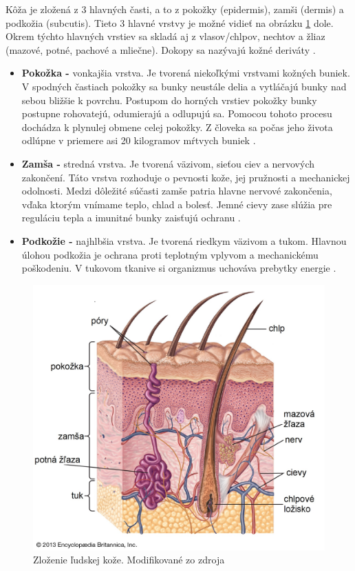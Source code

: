 Kôža je zložená z 3 hlavných časti, a to z pokožky (epidermis), zamši (dermis) a podkožia (subcutis). Tieto 3 hlavné vrstvy je možné vidieť na obrázku \ref{fig:koza} dole. Okrem týchto hlavných vrstiev sa skladá aj z vlasov/chlpov, nechtov a žliaz (mazové, potné, pachové a mliečne). Dokopy sa nazývajú kožné deriváty \cite{Pokorna2012}. 
\begin{itemize}  
\item \textbf{Pokožka -} vonkajšia vrstva. Je tvorená niekoľkými vrstvami kožných buniek. V spodných častiach pokožky sa bunky neustále delia a vytláčajú bunky nad sebou bližšie k povrchu. Postupom do horných vrstiev pokožky bunky postupne rohovatejú, odumierajú a odlupujú sa. Pomocou tohoto procesu dochádza k plynulej obmene celej pokožky. Z človeka sa počas jeho života odlúpne v priemere asi 20 kilogramov mŕtvych buniek \cite{pcCdSrbbhhlr5YcQ}. 
\item \textbf{Zamša -} stredná vrstva. Je tvorená väzivom, sieťou ciev a nervových zakončení. Táto vrstva rozhoduje o pevnosti kože, jej pružnosti a mechanickej odolnosti. Medzi dôležité súčasti zamše patria hlavne nervové zakončenia, vďaka ktorým vnímame teplo, chlad a bolesť. Jemné cievy zase slúžia pre reguláciu tepla a imunitné bunky zaisťujú ochranu \cite{pcCdSrbbhhlr5YcQ}.
\item \textbf{Podkožie -} najhlbšia vrstva. Je tvorená riedkym väzivom a tukom. Hlavnou úlohou podkožia je ochrana proti teplotným vplyvom a mechanickému poškodeniu. V tukovom tkanive si organizmus uchováva prebytky energie \cite{pcCdSrbbhhlr5YcQ, Hlinkova2015}. 
\end{itemize}
\begin{figure}[h]
  \centering
  \includegraphics[scale=0.19]{fig/koza.jpg}
  \caption{Zloženie ľudskej kože. Modifikované zo zdroja \cite{Ebling2016}}
  \label{fig:koza}
\end{figure}

